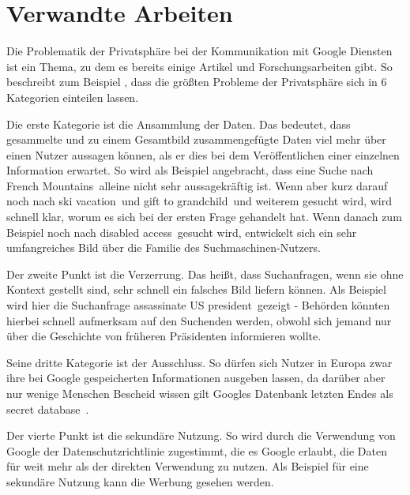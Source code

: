% 
% 

\chapter{Verwandte Arbeiten}
Die Problematik der Privatsphäre bei der Kommunikation mit Google Diensten ist ein Thema, zu dem es bereits einige Artikel und Forschungsarbeiten gibt. So beschreibt zum Beispiel \citet{tene2007google}, dass die größten Probleme der Privatsphäre sich in 6 Kategorien einteilen lassen.

Die erste Kategorie ist die Ansammlung der Daten. Das bedeutet, dass gesammelte und zu einem Gesamtbild zusammengefügte Daten viel mehr über einen Nutzer aussagen können, als er dies bei dem Veröffentlichen einer einzelnen Information erwartet. So wird als Beispiel angebracht, dass eine Suche nach \glqq French Mountains\grqq\ alleine nicht sehr aussagekräftig ist. Wenn aber kurz darauf noch nach \glqq ski vacation\grqq\ und \glqq gift to grandchild\grqq\ und weiterem gesucht wird, wird schnell klar, worum es sich bei der ersten Frage gehandelt hat. Wenn danach zum Beispiel noch nach \glqq disabled access\grqq\ gesucht wird, entwickelt sich ein sehr umfangreiches Bild über die Familie des Suchmaschinen-Nutzers. 

Der zweite Punkt ist die Verzerrung. Das heißt, dass Suchanfragen, wenn sie ohne Kontext gestellt sind, sehr schnell ein falsches Bild liefern können. Als Beispiel wird hier die Suchanfrage \glqq assassinate US president\grqq\ gezeigt - Behörden könnten hierbei schnell aufmerksam auf den Suchenden werden, obwohl sich jemand nur über die Geschichte von früheren Präsidenten informieren wollte.

Seine dritte Kategorie ist der Ausschluss. So dürfen sich Nutzer in Europa zwar ihre bei Google gespeicherten Informationen ausgeben lassen, da darüber aber nur wenige Menschen Bescheid wissen gilt Googles Datenbank letzten Endes als \glqq secret database\grqq\ . 

Der vierte Punkt ist die \glqq sekundäre Nutzung\grqq . So wird durch die Verwendung von Google der Datenschutzrichtlinie zugestimmt, die es Google erlaubt, die Daten für weit mehr als der direkten Verwendung zu nutzen. Als Beispiel für eine sekundäre Nutzung kann die Werbung gesehen werden. 

